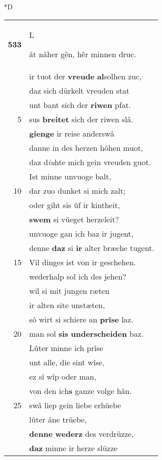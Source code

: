 \documentclass[8pt,a4paper,notitlepage]{article}
\begin{document}
\begin{table}[ht]
\begin{minipage}[t]{0.5\linewidth}
\small
\begin{center}*D
\end{center}
\begin{tabular}{rl}
\textbf{533} & \begin{large}L\end{large}ât nâher gên, hêr minnen druc.\\ 
 & ir tuot der \textbf{vreude} \textbf{al}solhen zuc,\\ 
 & daz sich dürkelt vreuden stat\\ 
 & unt bant sich der \textbf{riwen} pfat.\\ 
5 & sus \textbf{breitet} sich der riwen slâ.\\ 
 & \textbf{gienge} ir reise anderswâ\\ 
 & danne in des herzen hôhen muot,\\ 
 & daz d\textit{iu}hte mich gein vreuden guot.\\ 
 & Ist minne unvuoge balt,\\ 
10 & dar zuo dunket si mich zalt;\\ 
 & oder giht sis ûf ir kintheit,\\ 
 & \textbf{swem} si vüeget herzeleit?\\ 
 & unvuoge gan ich baz ir jugent,\\ 
 & denne \textbf{daz} si \textbf{ir} alter bræche tugent.\\ 
15 & Vil dinges ist von ir geschehen.\\ 
 & wederhalp sol ich des jehen?\\ 
 & wil si mit jungen ræten\\ 
 & ir alten site unstæten,\\ 
 & sô wirt si schiere an \textbf{prîse} laz.\\ 
20 & man sol \textbf{sis} \textbf{underscheiden} baz.\\ 
 & Lûter minne ich prîse\\ 
 & unt alle, die sint wîse,\\ 
 & ez sî wîp oder man,\\ 
 & von den ich\textbf{s} ganze volge hân.\\ 
25 & swâ liep gein liebe erhüebe\\ 
 & lûter âne trüebe,\\ 
 & \textbf{denne} \textbf{wederz} des verdrüzze,\\ 
 & \textbf{daz} minne ir herze slüzze\\ 

\end{tabular}
\end{minipage}
\end{table}
\end{document}
